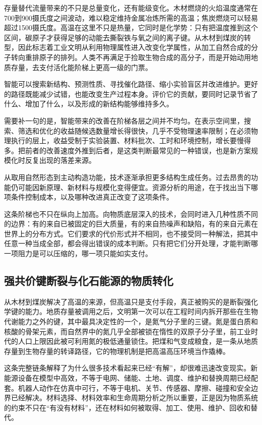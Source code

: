 存量替代流量带来的不只是总量变化，还有能级变化。木材燃烧的火焰温度通常在700到900摄氏度之间波动，难以稳定维持金属冶炼所需的高温；焦炭燃烧可以轻易超过1500摄氏度。高温在这里不只是热量，它同时是化学势：只有把温度推到这个区间，碳原子才获得足够的动能去撕裂铁与氧之间的离子键。从木材到煤炭的转型，因此标志着工业文明从利用物理属性进入改变化学属性，从加工自然合成的分子转向重排原子的排列。人类不再满足于捡取生物合成的高分子，而是开始动用地质存量，去支付活化能阶梯上更高一级的门票。


智能可以搜索新结构、预测性质、寻找催化路径、缩小实验盲区并改进维护。更好的路径既能减少试错，也能改变生产过程本身。评价它的贡献，要同时记录节省了什么、增加了什么，以及形成的新结构能够维持多久。

需要补一句的是，智能带来的改善在阶梯各层之间并不均匀。在表示空间里，搜索、筛选和优化的收益随候选数量增长得很快，几乎不受物理速率限制；在必须物理执行的层上，收益受制于实验装置、材料批次、工时和环境控制，增长要慢得多。把前者的改善速度外推到后者，是这类判断最常见的一种错误，也是新方案规模化时反复出现的落差来源。

从取用自然形态到主动构造功能，技术逐渐承担更多结构生成任务。过去昂贵的功能仍可能因新原理、新材料与规模化变得便宜。资源分析的用途，在于找出当下哪项条件控制成本，以及哪种改进真正改变了这项条件。

这条阶梯也不只在纵向上加高。向物质底层深入的技术，会同时进入几种性质不同的边界：有的来自已被固定的巨大质量，有的来自热噪声和缺陷，有的来自元素在世界上的分布方式。它们要求的代价形式并不相同，也不接受同一种解法，把其中任意一种当成全部，都会得出错误的成本判断。只有把它们分开处理，才能判断哪一项阻力是可以压缩的，哪一项只能如实支付。

\subsection{强共价键断裂与化石能源的物质转化}

从木材到煤炭解决了高温的来源，但高温只是支付手段，真正被购买的是断裂强化学键的能力。地质存量被调用之后，文明第一次可以在工程时间内拆开那些在生物代谢能力之外的键，其中最具决定性的一个，是氮气分子里的三键。氮是蛋白质和核酸的骨架元素，而自然界中的氮几乎全部被锁在惰性的双原子分子里，前工业时代的人口上限因此被可利用氮的极低通量锁住。把煤和气变成粮食，是一条从地质存量到生物存量的转译路径，它的物理机制是把高温高压环境当作撬棒。


这条完整链条解释了为什么很多技术看起来已经“有解”，却很难迅速改变现实。新能源设备在模型中高效，不等于电网、储能、土地、调度、维护和替换周期已经配套。机器人动作在仿真中可行，不等于电机、关节、传感器、摩擦、碰撞和安全边界已经解决。材料选择、材料效率和生命周期分析之所以重要，正是因为物质系统的约束不只在“有没有材料”，还在材料如何被取得、加工、使用、维护、回收和替代。\cite{ashby2012materials,allwood2012sustainable}

